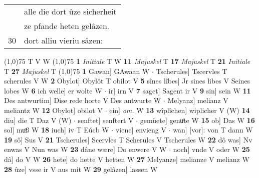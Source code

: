 \documentclass[8pt,a4paper,notitlepage]{article}
\begin{document}
\begin{table}[ht]
\begin{minipage}[t]{0.5\linewidth}
\begin{tabular}{rl}
 & alle die dort ûze sicherheit\\ 
 & ze pfande heten gelâzen.\\ 
30 & dort alliu vieriu sâzen:\\ 
\end{tabular}
\scriptsize
\line(1,0){75} \newline
T V W \newline
\line(1,0){75} \newline
\textbf{1} \textit{Initiale} T W  \textbf{11} \textit{Majuskel} T  \textbf{17} \textit{Majuskel} T  \textbf{21} \textit{Initiale} T  \textbf{27} \textit{Majuskel} T  \newline
\line(1,0){75} \newline
\textbf{1} Gawan] GAwaan W  $\cdot$ Tscherules] Tscervles T scherules V W \textbf{2} Obylot] Obylôt T obilot V \textbf{5} sînes lîbes] Jr sines libes V Seines lobes W \textbf{6} ich welle] er wolte W  $\cdot$ ir] irn V \textbf{7} saget] Sagent ir V \textbf{9} sin] sein W \textbf{11} Des antwurtim] Dise rede horte V Des antwurte W  $\cdot$ Melyanz] melianz V meliantz W \textbf{12} Obylot] obilot V  $\cdot$ ein] \textit{om.} W \textbf{13} wîplîchen] wiplicher V (W) \textbf{14} diu] die T Daz V (W)  $\cdot$ senftet] senftert V  $\cdot$ gemüete] genuͤte W \textbf{15} ob] Das W \textbf{16} sol] muͦß W \textbf{18} iuch] iv T Eúcb W  $\cdot$ vienc] envieng V  $\cdot$ wan] [vor]: von T dann W \textbf{19} sô] Sus V \textbf{21} Tscherules] Scervles T Scherules V Tscherules W \textbf{22} dô was] Nv enwas V Nun was W \textbf{23} dâne wære] Do enwere V W  $\cdot$ noch] vnde V oder W \textbf{25} dâ] do V W \textbf{26} hete] do hette V hetten W \textbf{27} Melyanze] melianze V melianz W \textbf{28} ûze] vsse ir V aus mit W \textbf{29} gelâzen] lassen W \newline
\end{minipage}
\end{table}
\end{document}
